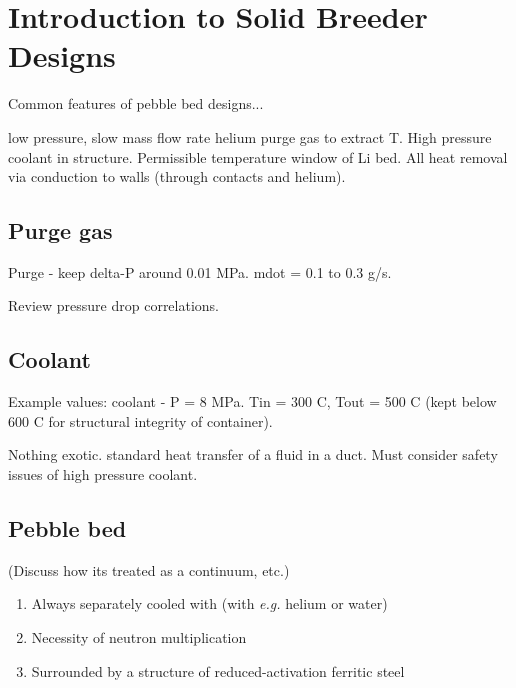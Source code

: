 \documentclass[11pt]{report} %
\begin{document}
\section{Introduction to Solid Breeder Designs}
Common features of pebble bed designs...

low pressure, slow mass flow rate helium purge gas to extract T. High pressure coolant in structure. Permissible temperature window of Li bed. All heat removal via conduction to walls (through contacts and helium).

\subsection{Purge gas}
Purge - keep delta-P around 0.01 MPa. mdot = 0.1 to 0.3 g/s.

Review pressure drop correlations.

\subsection{Coolant}

Example values: coolant - P = 8 MPa. Tin = 300 C, Tout = 500 C (kept below 600 C for structural integrity of container).

Nothing exotic. standard heat transfer of a fluid in a duct. Must consider safety issues of high pressure coolant.

\subsection{Pebble bed}
(Discuss how its treated as a continuum, etc.)



\begin{enumerate}
\item{Always separately cooled with (with \textit{e.g.} helium or water)}
\item{Necessity of neutron multiplication}
\item{Surrounded by a structure of reduced-activation ferritic steel}
\end{enumerate}
\end{document}
